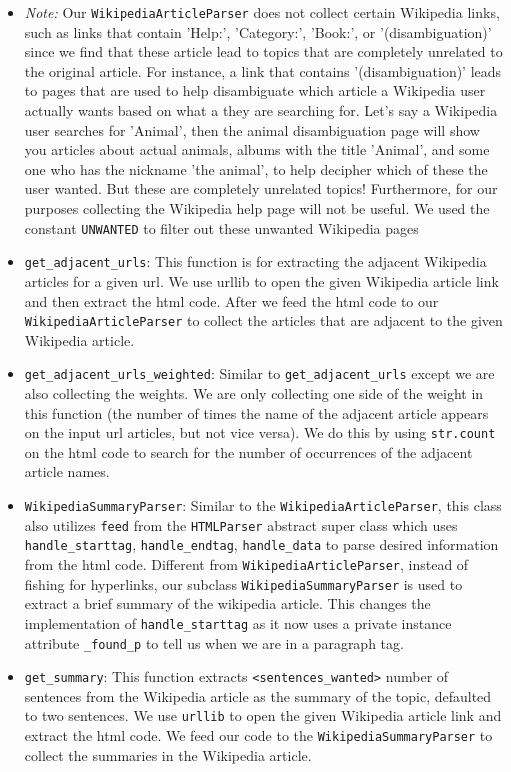 \documentclass[fontsize=11pt]{article}
\begin{document}
\begin{enumerate}
\begin{itemize}
        \item \textit{Note:} Our \texttt{WikipediaArticleParser} does not collect certain Wikipedia links, such as links that contain 'Help:', 'Category:', 'Book:', or '(disambiguation)' since we find that these article lead to topics that are completely unrelated to the original article. For instance, a link that contains '(disambiguation)' leads to pages that are used to help disambiguate which article a Wikipedia user actually wants based on what a they are searching for. Let's say a Wikipedia user searches for 'Animal', then the animal disambiguation page will show you articles about actual animals, albums with the title 'Animal', and some one who has the nickname 'the animal', to help decipher which of these the user wanted. But these are completely unrelated topics! Furthermore, for our purposes collecting the Wikipedia help page will not be useful. We used the constant \texttt{UNWANTED} to filter out these unwanted Wikipedia pages
        \item \texttt{get\_adjacent\_urls}: This function is for extracting the adjacent Wikipedia articles for a given url. We use urllib to open the given Wikipedia article link and then extract the html code. After we feed the html code to our \texttt{WikipediaArticleParser} to collect the articles that are adjacent to the given Wikipedia article.
        \item \texttt{get\_adjacent\_urls\_weighted}: Similar to \texttt{get\_adjacent\_urls} except we are also collecting the weights. We are only collecting one side of the weight in this function (the number of times the name of the adjacent article appears on the input url articles, but not vice versa). We do this by using \texttt{str.count} on the html code to search for the number of occurrences of the adjacent article names.
        \item \texttt{WikipediaSummaryParser}: Similar to the \texttt{WikipediaArticleParser}, this class also utilizes \texttt{feed} from the \texttt{HTMLParser} abstract super class which uses \texttt{handle\_starttag}, \texttt{handle\_endtag},  \texttt{handle\_data} to parse desired information from the html code. Different from \texttt{WikipediaArticleParser}, instead of fishing for hyperlinks, our subclass \texttt{WikipediaSummaryParser} is used to extract a brief summary of the wikipedia article. This changes the implementation of \texttt{handle\_starttag} as it now uses a private instance attribute \texttt{\_found\_p} to tell us when we are in a paragraph tag.
        \item \texttt{get\_summary}: This function extracts \texttt{<sentences\_wanted>} number of sentences from the Wikipedia article as the summary of the topic, defaulted to two sentences. We use \texttt{urllib} to open the given Wikipedia article link and extract the html code. We feed our code to the \texttt{WikipediaSummaryParser} to collect the summaries in the Wikipedia article.

\end{itemize}
\end{enumerate}
\end{document}
